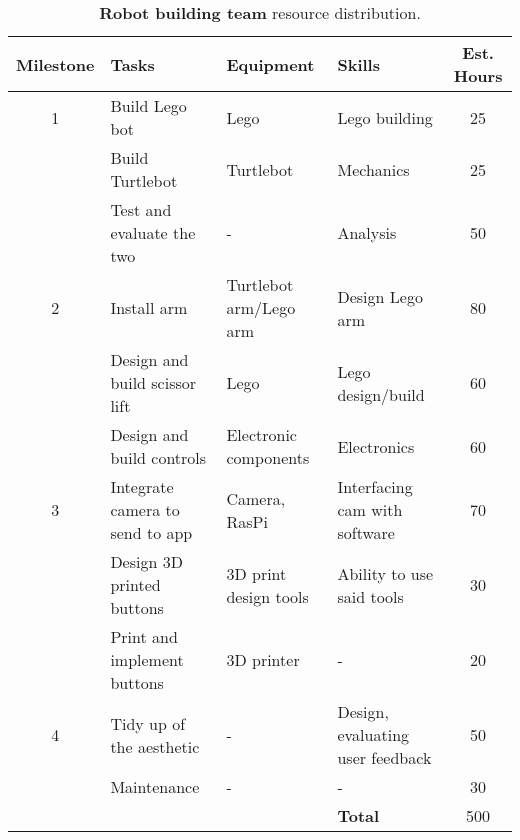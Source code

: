 \documentclass{article}
\begin{document}
\begin{table*}[]
  \begin{center}
  \begin{small}
  \begin{tabular}{|c|l|l|l|c|}
    \hline
    {\bf Milestone} & {\bf Tasks} & {\bf Equipment} & {\bf Skills} & {\bf Est. Hours} \\ \hline
    1               & Build Lego bot & Lego & Lego building & 25 \\ \cline{2-5}
                    & Build Turtlebot & Turtlebot & Mechanics & 25 \\ \cline{2-5}
                    & Test and evaluate the two & - & Analysis & 50 \\ \hline
    2               & Install arm & Turtlebot arm/Lego arm & Design Lego arm & 80 \\ \cline{2-5}
                    & Design and build scissor lift & Lego & Lego design/build & 60 \\ \cline{2-5}
                    & Design and build controls & Electronic components & Electronics & 60 \\ \hline
    3               & Integrate camera to send to app & Camera, RasPi & Interfacing cam with software & 70 \\ \cline{2-5}
                    & Design 3D printed buttons & 3D print design tools & Ability to use said tools & 30 \\ \cline{2-5}
                    & Print and implement buttons & 3D printer & - & 20 \\ \hline
    4               & Tidy up of the aesthetic & - & Design, evaluating user feedback & 50 \\ \cline{2-5}
                    & Maintenance & - & - & 30 \\ \hline
                    &                           &  & {\bf Total} & 500 \\ \hline
  \end{tabular}
  \end{small}
  \caption{{\bf Robot building team} resource distribution.}
  \end{center}
\end{table*}
\end{document}
